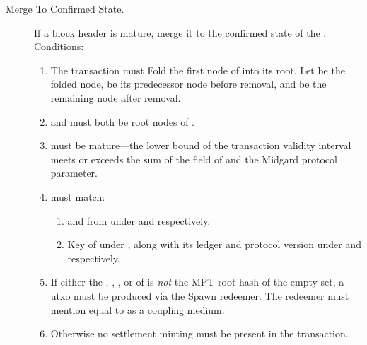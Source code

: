 \documentclass[../midgard.tex]{subfiles}
\begin{document}
\begin{description}
    \item[Merge To Confirmed State.] If a block header is mature, merge it to the confirmed state of the .
      Conditions:
    \begin{enumerate}
      \item The transaction must Fold the first node of  into its root.
        Let  be the folded node,  be its predecessor node before removal, and  be the remaining node after removal.
        \item {} and  must both be root nodes of .
        \item {} must be mature---the lower bound of the transaction validity interval meets or exceeds the sum of the  field of  and the Midgard  protocol parameter.
        \item {} must match:
          \begin{enumerate}
            \item {} and  from  under  and  respectively.
            \item Key of  under , along with its ledger and protocol version under  and  respectively.
          \end{enumerate}
        \item If either the , , , or  of  is \emph{not} the MPT root hash of the empty set, a  utxo must be produced via the Spawn redeemer.
          The redeemer must mention  equal to  as a coupling medium.
        \item Otherwise no settlement minting must be present in the transaction.
    \end{enumerate}


\end{description}
\end{document}
